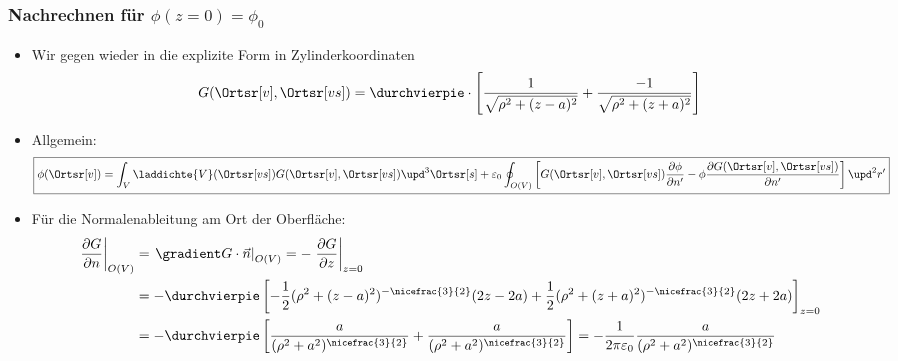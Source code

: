 \begin{frame}
\frametitle{Nachrechnen für $\phi(z=0) = \phi_0$}
\begin{itemize}[<+->]
\item Wir gegen wieder in die explizite Form in Zylinderkoordinaten
    \begin{equation*}
	G(\Ortsr[v], \Ortsr[vs]) = \durchvierpie \cdot \left[
                  \dfrac{1}{\sqrt{\rho^2 + (z - a)^2}} +
                  \dfrac{-1}{\sqrt{\rho^2 + (z + a)^2}} \right]
              \end{equation*}
 \item Allgemein:
                     $$
\boxed{      \phi(\Ortsr[v]) = \int_V
  \laddichte{V}(\Ortsr[vs]) G(\Ortsr[v],\Ortsr[vs]) \upd^3\Ortsr[s] + \varepsilon_0 \oint_{O(V)} \left[ G(\Ortsr[v],\Ortsr[vs]) \frac{\partial\phi}{\partial n'} - \phi \frac{\partial G(\Ortsr[v],\Ortsr[vs])}{\partial n'}\right] \upd^2r'}
 $$
\item Für die Normalenableitung am Ort der Oberfläche:
  \begin{align*}
    \left. \frac{\partial G}{\partial n}\right|_{O(V)} & =\left. \gradient G \cdot \vec{n}\right|_{O(V)} = - \left. \frac{\partial G}{\partial z}\right|_{z=0}\\
                                                       &= - \durchvierpie \left[  -\frac{1}{2} ( \rho^2 + (z-a)^2 )^{-\nicefrac{3}{2}}(2z-2a) +\frac{1}{2} ( \rho^2 + (z+a)^2 )^{-\nicefrac{3}{2}}(2z+2a) \right]_{z=0}\\
    &= - \durchvierpie \left[  \frac{a}{(\rho^2 + a^2 )^{\nicefrac{3}{2}}}  + \frac{a}{(\rho^2 + a^2 )^{\nicefrac{3}{2}}} \right] = - \frac{1}{2\pi\varepsilon_0} \frac{a}{(\rho^2 + a^2 )^{\nicefrac{3}{2}}}
  \end{align*}
  \end{itemize}
\end{frame}

